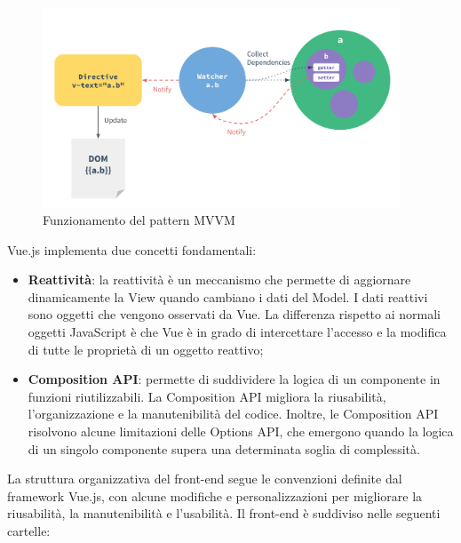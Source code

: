 \begin{figure}[H]
  \centering
  \includegraphics[width=0.95\textwidth]{assets/Frontend/overview_mvvm.png}
  \caption{Funzionamento del pattern MVVM}
\end{figure}

\par Vue.js implementa due concetti fondamentali:
\begin{itemize}
  \item \textbf{Reattività}: la reattività è un meccanismo che permette di aggiornare dinamicamente la View quando cambiano i dati del Model. I dati reattivi sono oggetti che vengono osservati da Vue. La differenza rispetto ai normali oggetti JavaScript è che Vue è in grado di intercettare l'accesso e la modifica di tutte le proprietà di un oggetto reattivo;
  \item \textbf{Composition API}: permette di suddividere la logica di un componente in funzioni riutilizzabili. La Composition API migliora la riusabilità, l'organizzazione e la manutenibilità del codice. Inoltre, le Composition API risolvono alcune limitazioni delle Options API, che emergono quando la logica di un singolo componente supera una determinata soglia di complessità.
\end{itemize}

\vspace{0.5\baselineskip}
\par La struttura organizzativa del front-end segue le convenzioni definite dal framework Vue.js, con alcune modifiche e personalizzazioni per migliorare la riusabilità, la manutenibilità e l'usabilità. Il front-end è suddiviso nelle seguenti cartelle:

\begin{minipage}{\textwidth}
\end{minipage}

